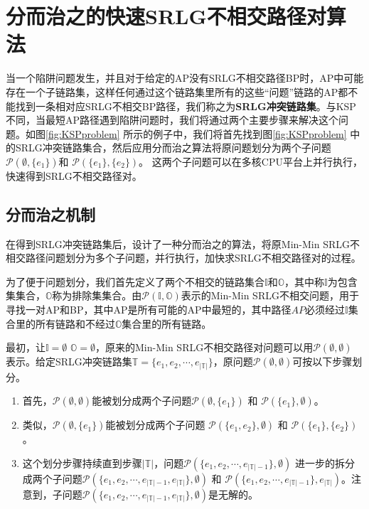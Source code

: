 \section{分而治之的快速SRLG不相交路径对算法}
当一个陷阱问题发生，并且对于给定的AP没有SRLG不相交路径BP时，AP中可能存在一个子链路集，这样任何通过这个链路集里所有的这些“问题”链路的AP都不能找到一条相对应SRLG不相交BP路径，我们称之为\textbf{SRLG冲突链路集}。与KSP 不同，当最短AP路径遇到陷阱问题时，我们将通过两个主要步骤来解决这个问题。如图\ref{fig:KSPproblem} 所示的例子中，我们将首先找到图\ref{fig:KSPproblem} 中的SRLG冲突链路集合，然后应用分而治之算法将原问题划分为两个子问题$\mathcal{P}(\emptyset,\{e_1\})$和 $\mathcal{P}(\{e_1\},\{e_2\})$。 这两个子问题可以在多核CPU平台上并行执行，快速得到SRLG不相交路径对。
\subsection{分而治之机制}
在得到SRLG冲突链路集后，设计了一种分而治之的算法，将原Min-Min SRLG不相交路径问题划分为多个子问题，并行执行，加快求SRLG不相交路径对的过程。

为了便于问题划分，我们首先定义了两个不相交的链路集合$\mathbb{I}$和$\mathbb{O}$，其中称$\mathbb{I}$为包含集集合，$\mathbb{O}$称为排除集集合。由$\mathcal{P}({\mathbb{I},\mathbb{O}})$表示的Min-Min SRLG不相交问题，用于寻找一对AP和BP，其中AP是所有可能的AP中最短的，其中路径$AP$必须经过$\mathbb{I}$集合里的所有链路和不经过$\mathbb{O}$集合里的所有链路。

最初，让$\mathbb{I}=\emptyset$ ${\mathbb{O}}=\emptyset$，原来的Min-Min SRLG不相交路径对问题可以用$\mathcal{P}(\emptyset,\emptyset)$ 表示。给定SRLG冲突链路集$\mathbb{T}=\{{e_1},{e_2}, \cdots ,{e_{\left| \mathbb{T} \right|}}\}$，原问题$\mathcal{P}(\emptyset,\emptyset)$可按以下步骤划分。

\begin{enumerate}
  \item 首先，$\mathcal{P}(\emptyset,\emptyset)$能被划分成两个子问题$\mathcal{P}(\emptyset,\{e_1\})$ 和 $\mathcal{P}(\{e_1\},\emptyset)$。
  \item 类似，$\mathcal{P}(\emptyset,\{e_1\})$能被划分成两个子问题 $\mathcal{P}(\{e_1,e_2\},\emptyset)$ 和 $\mathcal{P}(\{e_1\},\{e_2\})$。
  \item 这个划分步骤持续直到步骤$|\mathbb{T}|$，问题$\mathcal{P}(\{e_1,e_2,\cdots ,{e_{\left| \mathbb{T} \right|-1}}\},\emptyset)$ 进一步的拆分成两个子问题$\mathcal{P}(\{e_1,e_2,\cdots ,{e_{\left| \mathbb{T} \right|-1}}, {e_{\left| \mathbb{T} \right|}}\},\emptyset)$ 和 $\mathcal{P}(\{e_1,e_2,\cdots ,{e_{\left| \mathbb{T} \right|-1}}\},{e_{\left| \mathbb{T} \right|}})$。注意到，子问题$\mathcal{P}(\{e_1,e_2,\cdots ,{e_{\left| \mathbb{T} \right|-1}}, {e_{\left| \mathbb{T} \right|}}\},\emptyset)$是无解的。
\end{enumerate}



